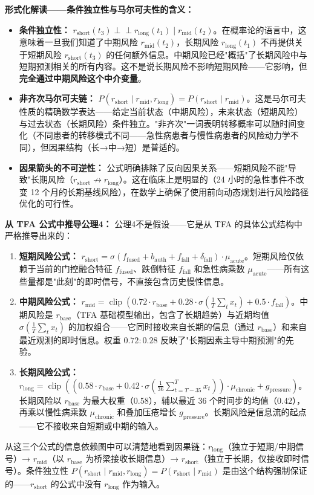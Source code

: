 \documentclass[11pt,a4paper]{ctexart}
\theoremstyle{remark}
\DeclareMathOperator{\clip}{clip}
\begin{document}
\textbf{形式化解读——条件独立性与马尔可夫性的含义：}
\begin{itemize}[nosep]
\item \textbf{条件独立性：} $r_{\text{short}}(t_3) \perp\!\!\!\perp r_{\text{long}}(t_1) \mid r_{\text{mid}}(t_2)$。在概率论的语言中，这意味着一旦我们知道了中期风险 $r_{\text{mid}}(t_2)$，长期风险 $r_{\text{long}}(t_1)$ 不再提供关于短期风险 $r_{\text{short}}(t_3)$ 的任何额外信息。中期风险已经"概括"了长期风险中与短期预测相关的所有内容。这不是说长期风险不影响短期风险——它影响，但\textbf{完全通过中期风险这个中介变量}。
\item \textbf{非齐次马尔可夫链：} $P(r_{\text{short}} \mid r_{\text{mid}}, r_{\text{long}}) = P(r_{\text{short}} \mid r_{\text{mid}})$。这是马尔可夫性质的精确数学表达——给定当前状态（中期风险），未来状态（短期风险）与过去状态（长期风险）条件独立。"非齐次"一词表明转移概率可以随时间变化（不同患者的转移模式不同——急性病患者与慢性病患者的风险动力学不同），但因果结构（长→中→短）是普适的。
\item \textbf{因果箭头的不可逆性：} 公式明确排除了反向因果关系——短期风险不能"导致"长期风险（$r_{\text{short}} \not\to r_{\text{long}}$）。这在临床上是明显的（24 小时的急性事件不改变 12 个月的长期基线风险），在数学上确保了使用前向动态规划进行风险路径优化的可行性。
\end{itemize}

\textbf{从 TFA 公式中推导公理4：} 公理4不是假设——它是从 TFA 的具体公式结构中严格推导出来的：
\begin{enumerate}[nosep]
\item \textbf{短期风险公式：} $r_{\text{short}} = \sigma(f_{\text{fused}} + b_{\text{auth}} + f_{\text{fall}} + \delta_{\text{fall}}) \cdot \mu_{\text{acute}}$。短期风险仅依赖于当前的门控融合特征 $f_{\text{fused}}$、跌倒特征 $f_{\text{fall}}$ 和急性病乘数 $\mu_{\text{acute}}$——所有这些量都是"此刻"的即时信号，不直接包含历史慢性信息。
\item \textbf{中期风险公式：} $r_{\text{mid}} = \clip(0.72 \cdot r_{\text{base}} + 0.28 \cdot \sigma(\frac{1}{T}\sum_t x_t) + 0.5 \cdot f_{\text{fall}})$。中期风险是 $r_{\text{base}}$（TFA 基础模型输出，包含了长期趋势）与近期均值 $\sigma(\frac{1}{T}\sum_t x_t)$ 的加权组合——它同时接收来自长期的信息（通过 $r_{\text{base}}$）和来自最近观测的即时信息。权重 $0.72:0.28$ 反映了"长期因素主导中期预测"的先验。
\item \textbf{长期风险公式：} $r_{\text{long}} = \clip((0.58 \cdot r_{\text{base}} + 0.42 \cdot \sigma(\frac{1}{36}\sum_{t=T-35}^{T} x_t)) \cdot \mu_{\text{chronic}} + g_{\text{pressure}})$。长期风险以 $r_{\text{base}}$ 为最大权重（$0.58$），辅以最近 36 个时间步的均值（$0.42$），再乘以慢性病乘数 $\mu_{\text{chronic}}$ 和叠加压疮增长 $g_{\text{pressure}}$。长期风险是信息流的起点——它不接收来自短期或中期的输入。
\end{enumerate}
从这三个公式的信息依赖图中可以清楚地看到因果链：$r_{\text{long}}$（独立于短期/中期信号）→ $r_{\text{mid}}$（以 $r_{\text{base}}$ 为桥梁接收长期信息）→ $r_{\text{short}}$（独立于长期，仅接收即时信号）。条件独立性 $P(r_{\text{short}} \mid r_{\text{mid}}, r_{\text{long}}) = P(r_{\text{short}} \mid r_{\text{mid}})$ 是由这个结构强制保证的——$r_{\text{short}}$ 的公式中没有 $r_{\text{long}}$ 作为输入。
\end{document}
